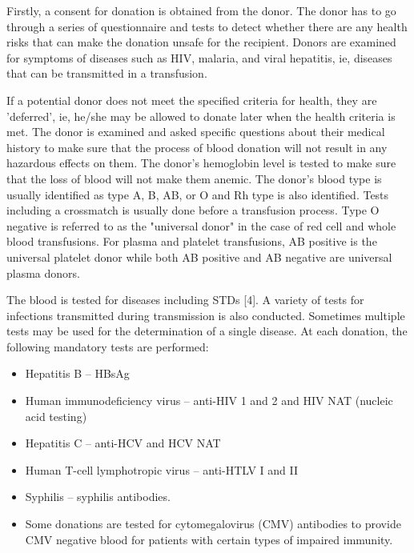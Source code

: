 Firstly, a consent for donation is obtained from the donor. The donor has to go through a series of questionnaire and tests to detect whether there are any health risks that can make the donation unsafe for the recipient. Donors are examined for symptoms of diseases such as HIV, malaria, and viral hepatitis, ie, diseases that can be transmitted in a transfusion.

\noindent
If a potential donor does not meet the specified criteria for health, they are 'deferred', ie, he/she may be allowed to donate later when the health criteria is met. The donor is examined and asked specific questions about their medical history to make sure that the process of blood donation will not result in any hazardous effects on them. The donor's hemoglobin level is tested to make sure that the loss of blood will not make them anemic.
\noindent The donor's blood type is usually identified as type A, B, AB, or O and Rh type is also identified. Tests including a crossmatch is usually done before a transfusion process. Type O negative is referred to as the "universal donor" in the case of red cell and whole blood transfusions. For plasma and platelet transfusions, AB positive is the universal platelet donor while both AB positive and AB negative are universal plasma donors.\par
\noindent
The blood is tested for diseases including STDs [4]. A variety of tests for infections transmitted during transmission is also conducted. Sometimes multiple tests may be used for the determination of a single disease. At each donation, the following mandatory tests are performed:

\begin{itemize}
\item Hepatitis B – HBsAg
\item Human immunodeficiency virus – anti-HIV 1 and 2 and HIV NAT (nucleic acid testing)
\item Hepatitis C – anti-HCV and HCV NAT
\item Human T-cell lymphotropic virus – anti-HTLV I and II
\item Syphilis – syphilis antibodies.
\item Some donations are tested for cytomegalovirus (CMV) antibodies to provide CMV negative blood for patients with certain types of impaired immunity.
\end{itemize}

